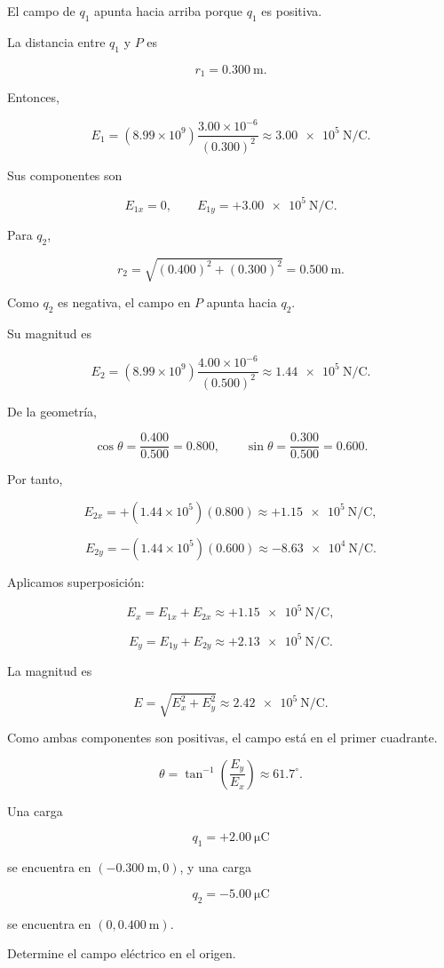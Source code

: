 \begin{explicacion}

El campo de \(q_1\) apunta hacia arriba porque \(q_1\) es positiva.

La distancia entre \(q_1\) y \(P\) es

\[
r_1=\SI{0.300}{\metre}.
\]

Entonces,

\[
E_1=(8.99\times10^9)\frac{3.00\times10^{-6}}{(0.300)^2}
\approx\SI{3.00e5}{\newton\per\coulomb}.
\]

Sus componentes son

\[
E_{1x}=0,\qquad E_{1y}=+\SI{3.00e5}{\newton\per\coulomb}.
\]

Para \(q_2\),

\[
r_2=\sqrt{(0.400)^2+(0.300)^2}=\SI{0.500}{\metre}.
\]

Como \(q_2\) es negativa, el campo en \(P\) apunta hacia \(q_2\).

Su magnitud es

\[
E_2=(8.99\times10^9)\frac{4.00\times10^{-6}}{(0.500)^2}
\approx\SI{1.44e5}{\newton\per\coulomb}.
\]

De la geometría,

\[
\cos\theta=\frac{0.400}{0.500}=0.800,\qquad
\sin\theta=\frac{0.300}{0.500}=0.600.
\]

Por tanto,

\[
E_{2x}=+(1.44\times10^5)(0.800)\approx+\SI{1.15e5}{\newton\per\coulomb},
\]

\[
E_{2y}=-(1.44\times10^5)(0.600)\approx-\SI{8.63e4}{\newton\per\coulomb}.
\]

Aplicamos superposición:

\[
E_x=E_{1x}+E_{2x}\approx+\SI{1.15e5}{\newton\per\coulomb},
\]

\[
E_y=E_{1y}+E_{2y}\approx+\SI{2.13e5}{\newton\per\coulomb}.
\]

La magnitud es

\[
E=\sqrt{E_x^2+E_y^2}\approx\SI{2.42e5}{\newton\per\coulomb}.
\]

Como ambas componentes son positivas, el campo está en el primer cuadrante.

\[
\theta=\tan^{-1}\left(\frac{E_y}{E_x}\right)\approx61.7^\circ.
\]

\end{explicacion}


\begin{ejercicio}

Una carga

\[
q_1=+\SI{2.00}{\micro\coulomb}
\]

se encuentra en \((-\SI{0.300}{\metre},0)\), y una carga

\[
q_2=-\SI{5.00}{\micro\coulomb}
\]

se encuentra en \((0,\SI{0.400}{\metre})\).

Determine el campo eléctrico en el origen.

\end{ejercicio}

